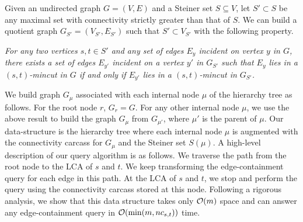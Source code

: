Given an undirected graph $G=(V,E)$ and a Steiner set $S\subseteq V$, let $S'\subset S$ be any maximal set with connectivity strictly greater than that of $S$. We can build a quotient graph $G_{S'}=(V_{S'},E_{S'})$ such that $S' \subset V_{S'}$ with the following property.

{\em
For any two vertices $s,t \in S'$ and any set of edges $E_y$ incident on vertex $y$ in $G$, there exists a set of edges $E_{y'}$ incident on a vertex $y'$ in $G_{S'}$ such that $E_y$ lies in a $(s,t)$-mincut in $G$ if and only if $E_{y'}$ lies in a $(s,t)$-mincut in $G_{S'}$. 
}

We build graph $G_\mu$ associated with each internal node $\mu$ of the hierarchy tree as follows. For the root node $r$, $G_r = G$. For any other internal node $\mu$, we use the above result to build the graph $G_{\mu}$ from $G_{\mu'}$, where $\mu'$ is the parent of $\mu$. 
Our data-structure is the hierarchy tree where each internal node $\mu$ is augmented with the connectivity carcass for $G_\mu$ and the Steiner set $S(\mu)$. A high-level description of our query algorithm is as follows. 
We traverse the path from the root node to the LCA of $s$ and $t$.
We keep transforming the edge-containment query for each edge in this path.
At the LCA of $s$ and $t$, we stop and perform the query using the connectivity carcass 
stored at this node.
Following a rigorous analysis, we show that this data structure takes only ${\cal O}(m)$ space and can answer any edge-containment query in ${\cal O}(\min(m,nc_{s,t}))$ time.


